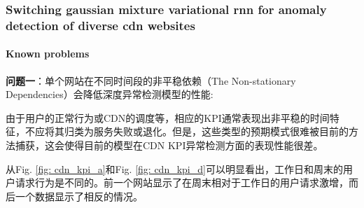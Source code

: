 \documentclass[letterpaper,12pt]{article}
\begin{document}
	\subsubsection{Switching gaussian mixture variational rnn for anomaly detection of diverse cdn websites\cite{dai2022switching}}
	
	\paragraph{Known problems}
	
	\textbf{问题一}：单个网站在不同时间段的非平稳依赖（The Non-stationary Dependencies）会降低深度异常检测模型的性能:
	
	由于用户的正常行为或CDN的调度等，相应的KPI通常表现出非平稳的时间特征，不应将其归类为服务失败或退化。但是，这些类型的预期模式很难被目前的方法捕获，这会使得目前的模型在CDN KPI异常检测方面的表现性能很差。
	
	从Fig. \ref{fig: cdn_kpi_a}和Fig. \ref{fig: cdn_kpi_d}可以明显看出，工作日和周末的用户请求行为是不同的。前一个网站显示了在周末相对于工作日的用户请求激增，而后一个数据显示了相反的情况。
	
\end{document}
